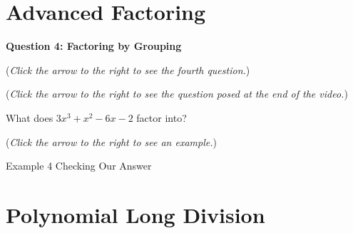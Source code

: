 \documentclass{ximera}
\begin{document}
\section{Advanced Factoring}


\textbf{Question 4: Factoring by Grouping}
\begin{question}
\begin{flushright}
{\color{blue}(\emph{Click the arrow to the right to see the fourth question.})}
\end{flushright}
\begin{center}
\begin{expandable}
{\color{blue}(\emph{Click the arrow to the right to see the  question
posed at the end of the video.})}
\begin{expandable}
What does $3x^3+x^2-6x-2$ factor into?
\begin{multipleChoice}
\end{multipleChoice}
\begin{flushright}
{\color{blue}(\emph{Click the arrow to the right to see an example.})}
\end{flushright}
\begin{expandable}
Example 4
Checking Our Answer %
\end{expandable}
\end{expandable}
\end{expandable}
\end{center}
\end{question}


\section{Polynomial Long Division}
\end{document}
